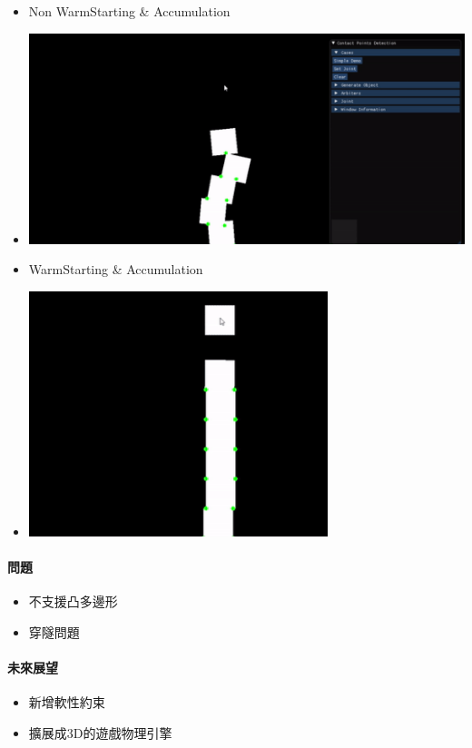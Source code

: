 \begin{itemize}
    \item{Non \- WarmStarting \& Accumulation}
    \item{\includegraphics[height=0.4\linewidth]{./resources/physics/none.png}}
    \item{WarmStarting \& Accumulation}
    \item{\includegraphics[height=0.4\linewidth]{./resources/physics/has.png}}
\end{itemize}


\paragraph{問題}

\begin{itemize}
    \item{不支援凸多邊形}
    \item{穿隧問題}
\end{itemize}

\paragraph{未來展望}
\begin{itemize}
    \item{新增軟性約束}
    \item{擴展成3D的遊戲物理引擎}
\end{itemize}
\newpage